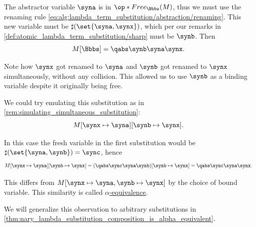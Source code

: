 \begin{example}
\begin{thmenum}
    The abstractor variable \( \syna \) is in \( \op*{Free}_\Bbbs(M) \), thus we must use the renaming rule \eqref{eq:alg:lambda_term_substitution/abstraction/renaming}. This new variable must be \( \sharp(\set{ \syna, \synx }) \), which per our remarks in \cref{def:atomic_lambda_term_substitution/sharp} must be \( \synb \). Then
    \begin{equation*}
      M[\Bbbs] = \qabs \synb \syna \synx.
    \end{equation*}

    Note how \( \synx \) got renamed to \( \syna \) and \( \synb \) got renamed to \( \synx \) simultaneously, without any collision. This allowed us to use \( \synb \) as a binding variable despite it originally being free.

    We could try emulating this substitution as in \cref{rem:simulating_simultaneous_substitution}:
    \begin{equation*}
      M[\synx \mapsto \syna][\synb \mapsto \synx].
    \end{equation*}

    In this case the fresh variable in the first substitution would be \( \sharp(\set{ \syna, \synb }) = \sync \), hence
    \begin{equation*}
      M[\synx \mapsto \syna][\synb \mapsto \synx]
      =
      (\qabs \sync \syna \synb)[\synb \mapsto \synx]
      =
      \qabs \sync \syna \synx.
    \end{equation*}

    This differs from \( M[\synx \mapsto \syna, \synb \mapsto \synx] \) by the choice of bound variable. This similarity is called \hyperref[def:lambda_term_alpha_equivalence]{\( \alpha \)-equivalence}.

    We will generalize this observation to arbitrary substitutions in \cref{thm:nary_lambda_substitution_composition_is_alpha_equivalent}.
  \end{thmenum}
\end{example}
